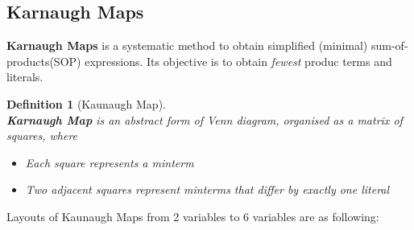 \documentclass[12pt]{article}
\newtheorem{definition}{Definition}[section]
\theoremstyle{definition}
\begin{document}
\subsection{Karnaugh Maps}
\textbf{Karnaugh Maps} is a systematic method to obtain simplified (minimal) sum-of-products(SOP) expressions. Its objective is to obtain \textit{fewest} produc terms and literals.
\begin{definition}[Kaunaugh Map]
\hfill\\\normalfont \textbf{Karnaugh Map} is an abstract form of Venn diagram, organised as a matrix of squares, where
\begin{itemize}
  \item Each square represents a minterm
  \item Two adjacent squares represent minterms that differ by \textit{exactly one} literal
\end{itemize}
\end{definition}
Layouts of Kaunaugh Maps from 2 variables to 6 variables are as following:
\end{document}
